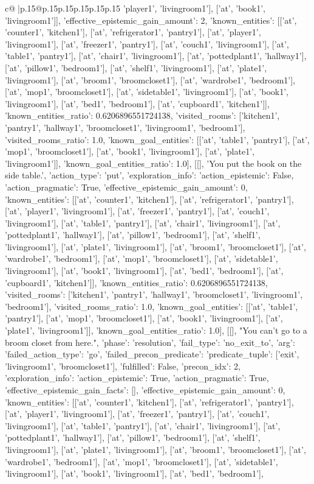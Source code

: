 \documentclass{article}
\begin{document}
{\begin{supertabular}{c@{$\;$}|p{.15\linewidth}@{}p{.15\linewidth}p{.15\linewidth}p{.15\linewidth}p{.15\linewidth}p{.15\linewidth}}
{{{'player1', 'livingroom1'], ['at', 'book1', 'livingroom1']], 'effective_epistemic_gain_amount': 2, 'known_entities': [['at', 'counter1', 'kitchen1'], ['at', 'refrigerator1', 'pantry1'], ['at', 'player1', 'livingroom1'], ['at', 'freezer1', 'pantry1'], ['at', 'couch1', 'livingroom1'], ['at', 'table1', 'pantry1'], ['at', 'chair1', 'livingroom1'], ['at', 'pottedplant1', 'hallway1'], ['at', 'pillow1', 'bedroom1'], ['at', 'shelf1', 'livingroom1'], ['at', 'plate1', 'livingroom1'], ['at', 'broom1', 'broomcloset1'], ['at', 'wardrobe1', 'bedroom1'], ['at', 'mop1', 'broomcloset1'], ['at', 'sidetable1', 'livingroom1'], ['at', 'book1', 'livingroom1'], ['at', 'bed1', 'bedroom1'], ['at', 'cupboard1', 'kitchen1']], 'known_entities_ratio': 0.6206896551724138, 'visited_rooms': ['kitchen1', 'pantry1', 'hallway1', 'broomcloset1', 'livingroom1', 'bedroom1'], 'visited_rooms_ratio': 1.0, 'known_goal_entities': [['at', 'table1', 'pantry1'], ['at', 'mop1', 'broomcloset1'], ['at', 'book1', 'livingroom1'], ['at', 'plate1', 'livingroom1']], 'known_goal_entities_ratio': 1.0}}], [[], 'You put the book on the side table.', {'action_type': 'put', 'exploration_info': {'action_epistemic': False, 'action_pragmatic': True, 'effective_epistemic_gain_amount': 0, 'known_entities': [['at', 'counter1', 'kitchen1'], ['at', 'refrigerator1', 'pantry1'], ['at', 'player1', 'livingroom1'], ['at', 'freezer1', 'pantry1'], ['at', 'couch1', 'livingroom1'], ['at', 'table1', 'pantry1'], ['at', 'chair1', 'livingroom1'], ['at', 'pottedplant1', 'hallway1'], ['at', 'pillow1', 'bedroom1'], ['at', 'shelf1', 'livingroom1'], ['at', 'plate1', 'livingroom1'], ['at', 'broom1', 'broomcloset1'], ['at', 'wardrobe1', 'bedroom1'], ['at', 'mop1', 'broomcloset1'], ['at', 'sidetable1', 'livingroom1'], ['at', 'book1', 'livingroom1'], ['at', 'bed1', 'bedroom1'], ['at', 'cupboard1', 'kitchen1']], 'known_entities_ratio': 0.6206896551724138, 'visited_rooms': ['kitchen1', 'pantry1', 'hallway1', 'broomcloset1', 'livingroom1', 'bedroom1'], 'visited_rooms_ratio': 1.0, 'known_goal_entities': [['at', 'table1', 'pantry1'], ['at', 'mop1', 'broomcloset1'], ['at', 'book1', 'livingroom1'], ['at', 'plate1', 'livingroom1']], 'known_goal_entities_ratio': 1.0}}], [[], "You can't go to a broom closet from here.", {'phase': 'resolution', 'fail_type': 'no_exit_to', 'arg': {'failed_action_type': 'go', 'failed_precon_predicate': {'predicate_tuple': ['exit', 'livingroom1', 'broomcloset1'], 'fulfilled': False, 'precon_idx': 2}}, 'exploration_info': {'action_epistemic': True, 'action_pragmatic': True, 'effective_epistemic_gain_facts': [], 'effective_epistemic_gain_amount': 0, 'known_entities': [['at', 'counter1', 'kitchen1'], ['at', 'refrigerator1', 'pantry1'], ['at', 'player1', 'livingroom1'], ['at', 'freezer1', 'pantry1'], ['at', 'couch1', 'livingroom1'], ['at', 'table1', 'pantry1'], ['at', 'chair1', 'livingroom1'], ['at', 'pottedplant1', 'hallway1'], ['at', 'pillow1', 'bedroom1'], ['at', 'shelf1', 'livingroom1'], ['at', 'plate1', 'livingroom1'], ['at', 'broom1', 'broomcloset1'], ['at', 'wardrobe1', 'bedroom1'], ['at', 'mop1', 'broomcloset1'], ['at', 'sidetable1', 'livingroom1'], ['at', 'book1', 'livingroom1'], ['at', 'bed1', 'bedroom1'], }}}
\end{supertabular}}
\end{document}
